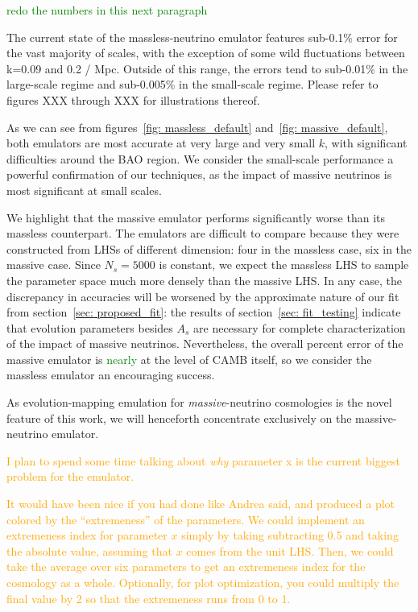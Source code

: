 \textcolor{green}{redo the numbers in this next paragraph}

The current state of the massless-neutrino emulator features sub-0.1\% error 
for the vast majority of scales, with the exception of some wild fluctuations  
between k=0.09 and 0.2 / Mpc. Outside of this range, the errors tend to 
sub-0.01\% in the large-scale regime and sub-0.005\% in the small-scale 
regime. Please refer to figures XXX through XXX for illustrations thereof.

As we can see from figures~\ref{fig: massless_default} 
and~\ref{fig: massive_default}, 
both emulators are most accurate at very large and
very small $k$, with significant difficulties around the BAO region. We
consider the small-scale performance a powerful confirmation of our
techniques, as the impact of massive neutrinos is most significant at small
scales.

We highlight that the massive emulator performs significantly worse than its 
massless counterpart. The emulators are difficult to compare because they
were constructed from LHSs of different dimension: four in the massless case,
six in the massive case. Since $N_s = 5000$ is constant, we expect the 
massless LHS to sample the parameter space much more densely than the massive
LHS. In any case, the discrepancy in accuracies will be worsened by the
approximate nature of our fit from section~\ref{sec: proposed_fit}:
the results of section~\ref{sec: fit_testing} indicate
that evolution parameters besides $A_s$ are necessary for complete
characterization of the impact of massive neutrinos. Nevertheless, the
overall percent error of the massive emulator is \textcolor{green}{nearly}
at the level of CAMB itself, so we consider the massless emulator an
encouraging success.

As evolution-mapping emulation for \textit{massive}-neutrino cosmologies
is the novel feature of this work, we will henceforth concentrate exclusively
on the massive-neutrino emulator.

\textcolor{orange}{I plan to spend some time talking 
about \textit{why} parameter x is the current biggest problem for the 
emulator.}

\textcolor{orange}{It would have been nice if you had done like Andrea said,
and produced a plot colored by the ``extremeness'' of the parameters. We
could implement an extremeness index for parameter $x$ simply by taking
subtracting 0.5 and taking the absolute value, assuming that $x$ comes from
the unit LHS. Then, we could take the average over six parameters to get
an extremeness index for the cosmology as a whole. Optionally, for plot
optimization, you could multiply the final value by 2 so that the extremeness
runs from 0 to 1.}


